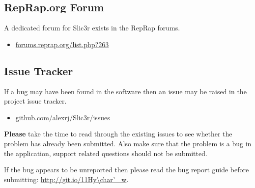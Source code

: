 \subsection{RepRap.org Forum} %
\label{sub:reprap_org_forum}


A dedicated forum for Slic3r exists in the RepRap forums.
\begin{itemize}
    \item \url{forums.reprap.org/list.php?263}
\end{itemize}


\subsection{Issue Tracker} %
\label{sub:issue_tracker}

If a bug may have been found in the software then an issue may be raised in the project issue tracker.

\begin{itemize}
    \item \url{github.com/alexrj/Slic3r/issues}
\end{itemize}

\textbf{Please} take the time to read through the existing issues to see whether the problem has already been submitted.  Also make sure that the problem is a bug in the application, support related questions should not be submitted.

If the bug appears to be unreported then please read the bug report guide before submitting: \url{http://git.io/11Hy\char`_w}.


